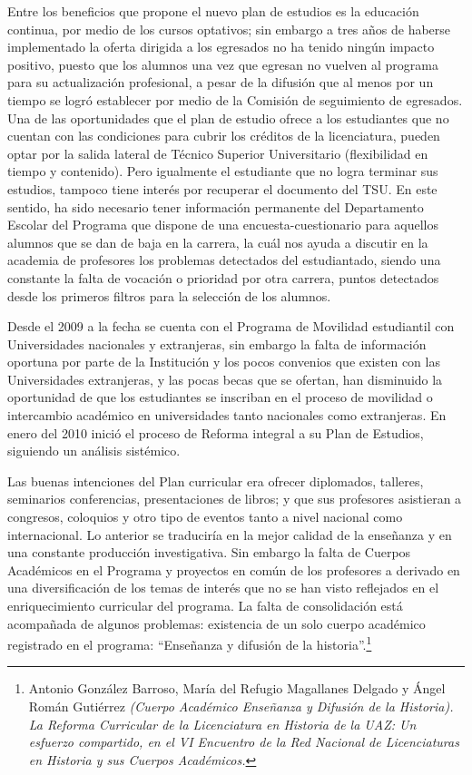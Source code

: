 Entre los beneficios que propone el nuevo plan de estudios es la educación
continua, por medio de los cursos optativos; sin embargo a tres años de
haberse implementado la oferta dirigida a los egresados no ha tenido ningún
impacto positivo, puesto que los alumnos una vez que egresan no vuelven al
programa para su actualización profesional,  a pesar de la difusión que al
menos por un tiempo se logró establecer por medio de la Comisión de
seguimiento de egresados. Una de las oportunidades que el plan de estudio
ofrece a los estudiantes que no cuentan con las condiciones  para cubrir
los créditos de la licenciatura, pueden optar por la salida lateral de
Técnico Superior Universitario (flexibilidad en tiempo y contenido). Pero
igualmente el estudiante que no logra terminar sus estudios, tampoco tiene
interés por recuperar el documento del TSU. En este sentido, ha sido
necesario tener información permanente del Departamento Escolar del
Programa que dispone de una encuesta-cuestionario para aquellos alumnos que
se dan de baja en la carrera, la cuál nos ayuda a discutir en la academia
de profesores los problemas detectados del estudiantado, siendo una
constante la falta de vocación o prioridad por otra carrera, puntos
detectados desde los primeros filtros para la selección de los alumnos.


Desde el 2009 a la fecha  se cuenta con el Programa de Movilidad estudiantil
con Universidades nacionales y extranjeras, sin embargo la falta de
información  oportuna por parte de la Institución y los pocos convenios que
existen con las Universidades extranjeras, y las pocas becas que se
ofertan, han disminuido la oportunidad de que los estudiantes se inscriban
en el proceso de movilidad o intercambio académico en universidades tanto
nacionales como extranjeras.  En enero del 2010 inició el proceso de
Reforma integral a su Plan de Estudios, siguiendo un análisis sistémico. 


Las buenas intenciones del Plan curricular era ofrecer diplomados, 
talleres, seminarios conferencias, presentaciones de libros; y que sus 
profesores asistieran a congresos, coloquios y otro tipo de eventos 
tanto a nivel nacional como internacional. Lo anterior se traduciría en 
la mejor calidad de la enseñanza y en una constante producción 
investigativa. Sin embargo la falta de Cuerpos Académicos en el 
Programa y proyectos en común de los profesores a derivado en una 
diversificación de los temas de interés que no se han visto reflejados 
en el enriquecimiento curricular del programa. La falta de 
consolidación está acompañada de algunos problemas: existencia de un 
solo cuerpo académico registrado en el programa: “Enseñanza y difusión 
de la historia”.\footnote{Antonio González Barroso, María del Refugio 
Magallanes Delgado y Ángel Román Gutiérrez \textit{(Cuerpo Académico 
Enseñanza y Difusión de la Historia). La Reforma Curricular de la 
Licenciatura en Historia de la UAZ: Un esfuerzo compartido, en  el VI 
Encuentro de la Red Nacional de Licenciaturas en Historia y sus Cuerpos 
Académicos.}} 


